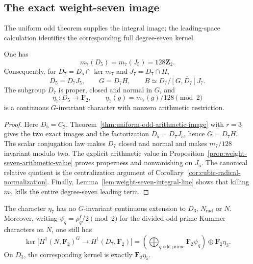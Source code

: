 \subsection{The exact weight-seven image}
\label{subsec:weight-seven-exact}

The uniform odd theorem supplies the integral image; the leading-space
calculation identifies the corresponding full degree-seven kernel.

\begin{theorem}\label{thm:weight-seven-exact-image}
One has
\[
 m_7(D_5)=m_7(J_5)=128\mathbf Z_2.
\]
Consequently, for $D_7=D_5\cap\ker m_7$ and $J_7=D_7\cap H$,
\[
 D_5=D_7J_5,\qquad G=D_7H,\qquad
 B\simeq D_7/\overline{[G,D_7]J_7}.
\]
The subgroup $D_7$ is proper, closed and normal in $G$, and
\[
 \eta_7:D_5\longrightarrow\mathbf F_2,
 \qquad \eta_7(g)=m_7(g)/128\pmod2
\]
is a continuous $G$-invariant character with nonzero arithmetic
restriction.
\end{theorem}

\begin{proof}
Here $D_5=C_2$. Theorem~\ref{thm:uniform-odd-arithmetic-image}
with $r=3$ gives the two exact images and the factorization
$D_5=D_7J_5$, hence $G=D_7H$. The scalar conjugation law makes
$D_7$ closed and normal and makes $m_7/128$ invariant modulo two.
The explicit arithmetic value in
Proposition~\ref{prop:weight-seven-arithmetic-value} proves properness
and nonvanishing on $J_5$. The canonical relative quotient is the
centralization argument of Corollary~\ref{cor:cubic-radical-normalization}.
Finally, Lemma~\ref{lem:weight-seven-integral-line} shows that killing
$m_7$ kills the entire degree-seven leading term.
\end{proof}

\begin{corollary}\label{cor:weight-seven-nonextension}
The character $\eta_7$ has no $G$-invariant continuous extension to
$D_3$, $N_{\mathrm{rad}}$ or $N$.
Moreover, writing $\psi_q=\rho_q^I/2\pmod2$ for the divided
odd-prime Kummer characters on $N$, one still has
\[
 \ker\bigl[H^1(N,\mathbf F_2)^G\longrightarrow
                         H^1(D_7,\mathbf F_2)\bigr]
 =\left(\bigoplus_{q\text{ odd prime}}\mathbf F_2\psi_q\right)
       \oplus\mathbf F_2\eta_3.
\]
On $D_3$, the corresponding kernel is exactly $\mathbf F_2\eta_5$.
\end{corollary}

